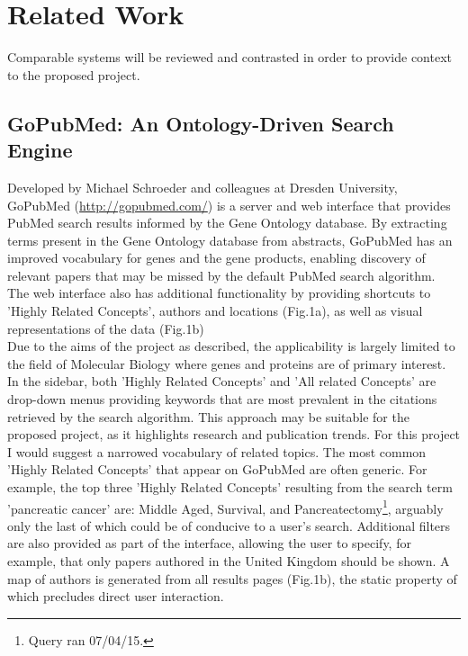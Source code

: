 \documentclass[PROP_AGutteridge_CS.tex]{subfiles}
\begin{document}
\chapter{Related Work}
Comparable systems will be reviewed and contrasted in order to provide context to the proposed project.

\section{GoPubMed: An Ontology-Driven Search Engine}
Developed by Michael Schroeder and colleagues at Dresden University, GoPubMed (\url{http://gopubmed.com/}) is a server and web interface that provides PubMed search results informed by the Gene Ontology database\cite{doms}. By extracting terms present in the Gene Ontology database from abstracts, GoPubMed has an improved vocabulary for genes and the gene products, enabling discovery of relevant papers that may be missed by the default PubMed search algorithm. The web interface also has additional functionality by providing shortcuts to 'Highly Related Concepts', authors and locations (Fig.1a), as well as visual representations of the data (Fig.1b) \\

\noindent Due to the aims of the project as described\cite{doms}, the applicability is largely limited to the field of Molecular Biology where genes and proteins are of primary interest. In the sidebar, both 'Highly Related Concepts' and 'All related Concepts' are drop-down menus providing keywords that are most prevalent in the citations retrieved by the search algorithm. This approach may be suitable for the proposed project, as it highlights research and publication trends. For this project I would suggest a narrowed vocabulary of related topics. The most common 'Highly Related Concepts' that appear on GoPubMed are often generic. For example, the top three 'Highly Related Concepts' resulting from the search term 'pancreatic cancer' are: Middle Aged, Survival, and Pancreatectomy\footnote{Query ran 07/04/15.}, arguably only the last of which could be of conducive to a user's search. Additional filters are also provided as part of the interface, allowing the user to specify, for example, that only papers authored in the United Kingdom should be shown. A map of authors is generated from all results pages (Fig.1b), the static property of which precludes direct user interaction. \newpage
\end{document}

